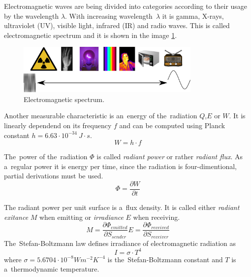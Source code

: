 Electromagnetic waves are being divided into categories according to their usage by the wavelength
$\lambda$. With increasing wavelength~$\lambda$ it is gamma, X-rays, ultraviolet (UV), visible light,
infrared (IR) and radio waves. This is called electromagnetic spectrum and it is shown in the image
\ref{fig:spectrum}.

\begin{figure}
\begin{center}
\includegraphics[width=0.8\textwidth]{img/spectrum.png}
\caption{Electromagnetic spectrum.\label{fig:spectrum}}
\end{center}    
\end{figure}

Another measurable characteristic is an~energy of the~radiation $Q$,$E$ or $W$. It is linearly dependend
on its frequency $f$ and can be computed using Planck constant $h=6.63\cdot10^{-34}~J\cdot s $.
\cite{NasaEMSpectrum}
\begin{equation}
W = h\cdot f
\end{equation}

The~power of the~radiation $\Phi$ is called {\it radiant power} or rather {\it radiant flux}. As a~regular
power it is energy per time, since the radiation is four-dimentional, partial derivations must be used.
\begin{equation}
\Phi = \frac{\partial W}{\partial t}
\end{equation}

The radiant power per unit surface is a~flux density. It is called either {\it radiant exitance} $M$
when emitting or {\it irradiance} $E$ when receiving.
\begin{subequations}
\begin{equation}
M = \frac{\partial \Phi_{emitted}}{\partial S_{sender}}
\end{equation}
\begin{equation}
E = \frac{\partial \Phi_{received}}{\partial S_{receiver}}
\end{equation}
\end{subequations}
The~Stefan-Boltzmann law defines irradiance of electromagnetic radiation as
\begin{equation}
I = \sigma \cdot T^4
\end{equation}
where $\sigma = 5.6704\cdot 10^{-8} Wm^{-2}K^{-4}$ is the~Stefan-Boltzmann constant and $T$ is a~thermodynamic
temperature.


